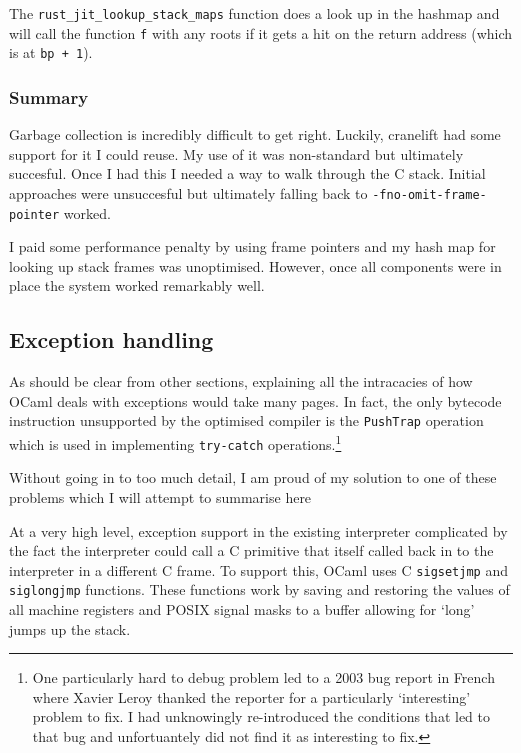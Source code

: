 The \texttt{rust\_jit\_lookup\_stack\_maps} function does a look up in the hashmap and will call
the function \texttt{f} with any roots if it gets a hit on the return address (which is at
\texttt{bp + 1}).

\subsubsection{Summary}

Garbage collection is incredibly difficult to get right. Luckily, cranelift had some support for it
I could reuse. My use of it was non-standard but ultimately succesful. Once I had this I needed a
way to walk through the C stack. Initial approaches were unsuccesful but ultimately falling back to
\texttt{-fno-omit-frame-pointer} worked.

I paid some performance penalty by using frame pointers and my hash map for looking up stack frames
was unoptimised. However, once all components were in place the system worked remarkably well.

\subsection{Exception handling}

As should be clear from other sections, explaining all the intracacies of how OCaml deals with
exceptions would take many pages. In fact, the only bytecode instruction unsupported by the
optimised compiler is the \texttt{PushTrap} operation which is used in implementing
\texttt{try-catch} operations.\footnote{One particularly hard to debug problem led to a 2003 bug
      report in French where Xavier Leroy thanked the reporter for a particularly `interesting'
      problem
      to fix. I had unknowingly re-introduced the conditions that led to that bug and unfortuantely
      did not find it as interesting to fix.}

Without going in to too much detail, I am proud of my solution to one of these problems which I
will attempt to summarise here

At a very high level, exception support in the existing interpreter complicated by the fact the
interpreter could call a C primitive that itself called back in to the interpreter in a different C
frame. To support this, OCaml uses C \texttt{sigsetjmp} and \texttt{siglongjmp} functions. These
functions work by saving and restoring the values of all machine registers and POSIX signal masks
to a buffer allowing for `long' jumps up the stack.

